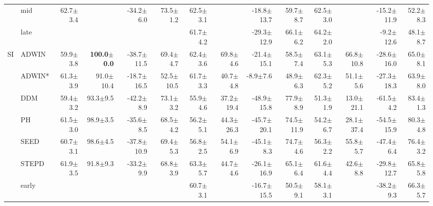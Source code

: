\begin{tabular}{llrrrrrrrrrrrr}
 & mid & 62.7\tiny{$\pm$3.4} &  & -34.2\tiny{$\pm$6.0} & 73.5\tiny{$\pm$1.2} & 62.5\tiny{$\pm$3.1} &  & -18.8\tiny{$\pm$13.7} & 59.7\tiny{$\pm$8.7} & 62.5\tiny{$\pm$3.0} &  & -15.2\tiny{$\pm$11.9} & 52.2\tiny{$\pm$8.3} \\
 & late &  &  &  &  & 61.7\tiny{$\pm$4.2} &  & -29.3\tiny{$\pm$12.9} & 66.1\tiny{$\pm$6.2} & 64.2\tiny{$\pm$2.0} &  & -9.2\tiny{$\pm$12.6} & 48.1\tiny{$\pm$8.7} \\
\midrule
\multirow[t]{9}{*}{SI} & ADWIN & 59.9\tiny{$\pm$3.8} & \textbf{100.0\tiny{$\pm$0.0}} & -38.7\tiny{$\pm$11.5} & 69.4\tiny{$\pm$4.7} & 62.4\tiny{$\pm$3.6} & 69.8\tiny{$\pm$4.6} & -21.4\tiny{$\pm$15.1} & 58.5\tiny{$\pm$7.4} & 63.1\tiny{$\pm$5.3} & 66.8\tiny{$\pm$10.8} & -28.6\tiny{$\pm$16.0} & 65.0\tiny{$\pm$8.1} \\
 & ADWIN* & 61.3\tiny{$\pm$3.9} & 91.0\tiny{$\pm$10.4} & -18.7\tiny{$\pm$16.5} & 52.5\tiny{$\pm$10.5} & 61.7\tiny{$\pm$3.3} & 40.7\tiny{$\pm$4.8} & -8.9\tiny{$\pm$7.6} & 48.9\tiny{$\pm$6.3} & 62.3\tiny{$\pm$5.2} & 51.1\tiny{$\pm$5.6} & -27.3\tiny{$\pm$18.3} & 63.9\tiny{$\pm$8.0} \\
 & DDM & 59.4\tiny{$\pm$3.2} & 93.3\tiny{$\pm$9.5} & -42.2\tiny{$\pm$8.9} & 73.1\tiny{$\pm$3.2} & 55.9\tiny{$\pm$4.6} & 37.2\tiny{$\pm$19.4} & -48.9\tiny{$\pm$15.8} & 77.9\tiny{$\pm$8.9} & 51.3\tiny{$\pm$1.9} & 13.0\tiny{$\pm$21.1} & -61.5\tiny{$\pm$4.2} & 83.4\tiny{$\pm$1.3} \\
 & PH & 61.5\tiny{$\pm$3.0} & 98.9\tiny{$\pm$3.5} & -35.6\tiny{$\pm$8.5} & 68.5\tiny{$\pm$4.2} & 56.2\tiny{$\pm$5.1} & 44.3\tiny{$\pm$26.3} & -45.7\tiny{$\pm$20.1} & 74.5\tiny{$\pm$11.9} & 54.2\tiny{$\pm$6.7} & 28.1\tiny{$\pm$37.4} & -54.5\tiny{$\pm$15.9} & 80.3\tiny{$\pm$4.8} \\
 & SEED & 60.7\tiny{$\pm$3.1} & 98.6\tiny{$\pm$4.5} & -37.8\tiny{$\pm$10.9} & 69.4\tiny{$\pm$5.3} & 56.8\tiny{$\pm$2.5} & 54.1\tiny{$\pm$6.9} & -45.1\tiny{$\pm$8.3} & 74.7\tiny{$\pm$4.6} & 56.3\tiny{$\pm$2.2} & 55.8\tiny{$\pm$5.7} & -47.4\tiny{$\pm$6.4} & 76.4\tiny{$\pm$3.2} \\
 & STEPD & 61.9\tiny{$\pm$3.5} & 91.8\tiny{$\pm$9.3} & -33.2\tiny{$\pm$9.9} & 68.8\tiny{$\pm$3.9} & 63.3\tiny{$\pm$5.7} & 44.7\tiny{$\pm$4.6} & -26.1\tiny{$\pm$16.9} & 65.1\tiny{$\pm$6.4} & 61.6\tiny{$\pm$4.4} & 42.6\tiny{$\pm$8.8} & -29.8\tiny{$\pm$12.7} & 65.8\tiny{$\pm$5.8} \\
 & early &  &  &  &  & 60.7\tiny{$\pm$3.1} &  & -16.7\tiny{$\pm$15.5} & 50.5\tiny{$\pm$9.1} & 58.1\tiny{$\pm$3.1} &  & -38.2\tiny{$\pm$9.3} & 66.3\tiny{$\pm$5.7} \\

\end{tabular}
